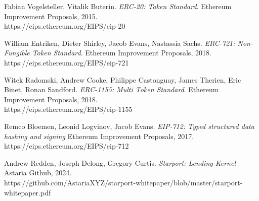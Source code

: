 \documentclass[12pt]{article}
\begin{document}
\begin{thebibliography}{9}
Fabian Vogelsteller, Vitalik Buterin. 
\textit{ERC-20: Token Standard}. 
Ethereum Improvement Proposals, 2015.\\
https://eips.ethereum.org/EIPS/eip-20

 William Entriken, Dieter Shirley, Jacob Evans, Nastassia Sachs. 
\textit{ERC-721: Non-Fungible Token Standard}. 
Ethereum Improvement Proposals, 2018.\\
https://eips.ethereum.org/EIPS/eip-721

Witek Radomski, Andrew Cooke, Philippe Castonguay, James Therien, Eric Binet, Ronan Sandford. 
\textit{ERC-1155: Multi Token Standard}. 
Ethereum Improvement Proposals, 2018.\\
https://eips.ethereum.org/EIPS/eip-1155

Remco Bloemen, Leonid Logvinov, Jacob Evans.
\textit{EIP-712: Typed structured data hashing and signing} 
Ethereum Improvement Proposals, 2017.\\
https://eips.ethereum.org/EIPS/eip-712

Andrew Redden, Joseph Delong, Gregory Curtis.
\textit{Starport: Lending Kernel} 
Astaria Github, 2024.\\
https://github.com/AstariaXYZ/starport-whitepaper/blob/master/starport-whitepaper.pdf

\end{thebibliography}
\end{document}
